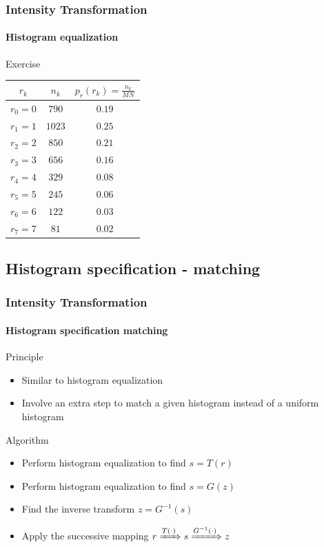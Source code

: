 \documentclass[table]{beamer}
\begin{document}
\begin{frame}
  \frametitle{Intensity Transformation}
  \framesubtitle{Histogram equalization}
  \begin{block}{Exercise}\footnotesize
    \begin{center}
      \renewcommand{\arraystretch}{1.5}
      \begin{tabular}{|ccc|}\hline
        \rowcolor{gray!20}
        $r_k$ & $n_k$ & $p_r(r_k) = \frac{n_k}{MN}$ \\ \hline
        $r_0 = 0$ & $790$ & $0.19$ \\
        $r_1 = 1$ & $1023$ & $0.25$ \\
        $r_2 = 2$ & $850$ & $0.21$ \\
        $r_3 = 3$ & $656$ & $0.16$ \\
        $r_4 = 4$ & $329$ & $0.08$ \\
        $r_5 = 5$ & $245$ & $0.06$ \\
        $r_6 = 6$ & $122$ & $0.03$ \\
        $r_7 = 7$ & $81$  & $0.02$ \\ \hline
      \end{tabular}
    \end{center}
  \end{block}
\end{frame}

\subsection{Histogram specification - matching}

\begin{frame}
  \frametitle{Intensity Transformation}
  \framesubtitle{Histogram specification matching}
  \begin{block}{Principle}\footnotesize
    \begin{itemize}
    \item Similar to histogram equalization
    \item Involve an extra step to match a given histogram instead of a uniform histogram
    \end{itemize}
  \end{block}
  \begin{block}{Algorithm}\footnotesize
    \begin{itemize}
    \item Perform histogram equalization to find $s = T(r)$
    \item Perform histogram equalization to find $s = G(z)$
    \item Find the inverse transform $z = G^{-1}(s)$
    \item Apply the successive mapping $r \xRightarrow{T(\cdot)} s \xRightarrow{G^{-1}(\cdot)} z$
    \end{itemize}
  \end{block}
\end{frame}
\end{document}
